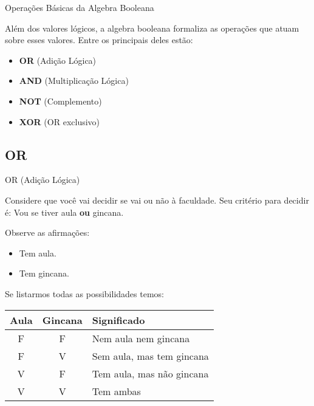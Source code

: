 

\begin{frame}{Operações Básicas da Algebra Booleana} 

	Além dos valores lógicos, a algebra booleana formaliza as operações que atuam sobre esses valores. Entre os principais deles estão:

	\vspace{1cm}
	\begin{itemize}
		\item \textbf{OR} (Adição Lógica)
		\item \textbf{AND} (Multiplicação Lógica)
		\item \textbf{NOT} (Complemento)
		\item \textbf{XOR} (OR exclusivo)
	\end{itemize}

	

\end{frame}

\subsection{OR}


\begin{frame}{OR (Adição Lógica)} 

	Considere que você vai decidir se vai ou não à faculdade. Seu critério para decidir é: Vou se tiver aula \textbf{ou} gincana.

	Observe as afirmações:

	\vspace{0.2cm}
	\begin{itemize}
		\item Tem aula.
		\item Tem gincana.
	\end{itemize}

	Se listarmos todas as possibilidades temos:

		\center 
		\vspace{0.4cm}

		\begin{tabular}{|c|c|l|} \hline 
			\textbf{Aula} & \textbf{Gincana} & \textbf{ Significado } \\ \hline 
			F & F & Nem aula nem gincana \\ \hline 
			F & V & Sem aula, mas tem gincana \\ \hline 
			V & F & Tem aula, mas não gincana \\ \hline 
			V & V & Tem ambas \\ \hline 
		\end{tabular} 

\end{frame}


